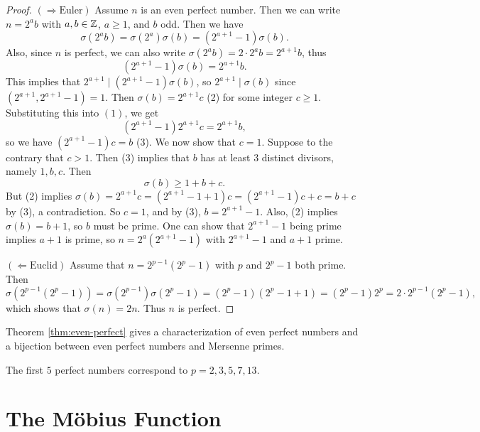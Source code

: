 \begin{proof}
  $(\Rightarrow \text{Euler})$
  Assume $n$ is an even perfect number.
  Then we can write $n = 2^a b$ with $a, b \in \mathbb{Z}$,
  $a \ge 1$, and $b$ odd. Then we have
  \[
    \sigma(2^a b)
    = \sigma(2^a) \sigma(b)
    = (2^{a + 1} - 1) \sigma(b).
  \]
  Also, since $n$ is perfect, we
  can also write
  $\sigma(2^a b) = 2 \cdot 2^a b = 2^{a + 1} b$,
  thus
  \[
    (2^{a + 1} - 1) \sigma(b)
    = 2^{a + 1} b. \tag{$1$}
  \]
  This implies that $2^{a + 1} \mid (2^{a + 1} - 1) \sigma(b)$,
  so $2^{a + 1} \mid \sigma(b)$
  since $(2^{a + 1}, 2^{a + 1} - 1) = 1$.
  Then $\sigma(b) = 2^{a + 1} c$ (2) for
  some integer $c \ge 1$. Substituting
  this into $(1)$, we get
  \[
    (2^{a + 1} - 1) 2^{a + 1} c
    = 2^{a + 1} b,
  \]
  so we have $(2^{a + 1} - 1) c = b$
  (3).
  We now show that $c = 1$.
  Suppose to the contrary that $c > 1$.
  Then (3) implies that $b$ has at least
  $3$ distinct divisors, namely
  $1, b, c$. Then
  \[
    \sigma(b) \ge 1 + b + c.
  \]
  But (2) implies
  $\sigma(b) = 2^{a + 1} c = (2^{a + 1} - 1 + 1) c = (2^{a + 1} - 1)c + c = b + c$
  by (3), a contradiction.
  So $c = 1$, and by (3), $b = 2^{a + 1} - 1$.
  Also, (2) implies $\sigma(b) = b + 1$,
  so $b$ must be prime.
  One can show that $2^{a + 1} - 1$
  being prime implies $a + 1$ is prime,
  so $n = 2^a (2^{a + 1} - 1)$ with
  $2^{a + 1} - 1$ and $a + 1$ prime.

  $(\Leftarrow \text{Euclid})$
  Assume that $n = 2^{p - 1}(2^p - 1)$
  with $p$ and $2^p - 1$ both prime.
  Then
  \[
    \sigma(2^{p - 1}(2^p - 1))
    = \sigma(2^{p - 1}) \sigma(2^p - 1)
    = (2^p - 1)(2^p - 1 + 1)
    = (2^p - 1) 2^p
    = 2 \cdot 2^{p - 1}(2^p - 1),
  \]
  which shows that $\sigma(n) = 2n$.
  Thus $n$ is perfect.
\end{proof}

\begin{remark}
  Theorem \ref{thm:even-perfect} gives a characterization of
  even perfect numbers and a bijection
  between even perfect numbers and
  Mersenne primes.
\end{remark}

\begin{example}
  The first $5$ perfect numbers
  correspond to $p = 2, 3, 5, 7, 13$.
\end{example}

\section{The M\"obius Function}

